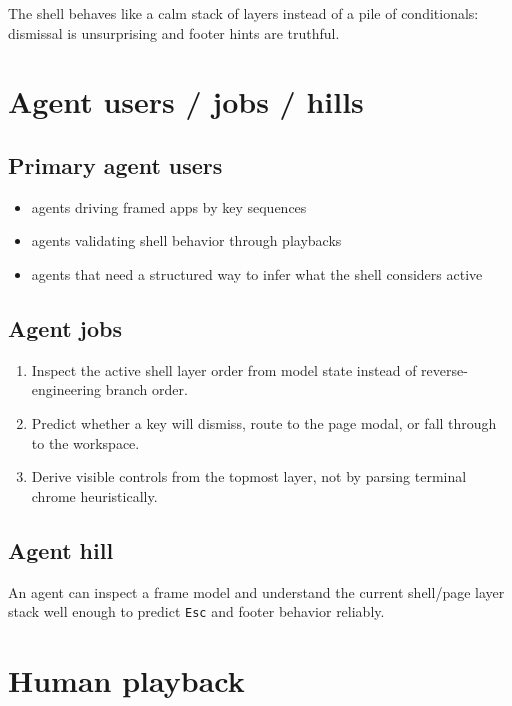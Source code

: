 The shell behaves like a calm stack of layers instead of a pile of conditionals: dismissal is unsurprising and footer hints are truthful.

\section{Agent users / jobs / hills}\label{record-255-agent-users-jobs-hills}

\subsection{Primary agent users}\label{record-255-primary-agent-users}

\begin{itemize}
\tightlist
\item
  agents driving framed apps by key sequences
\item
  agents validating shell behavior through playbacks
\item
  agents that need a structured way to infer what the shell considers active
\end{itemize}

\subsection{Agent jobs}\label{record-255-agent-jobs}

\begin{enumerate}
\def\labelenumi{\arabic{enumi}.}
\tightlist
\item
  Inspect the active shell layer order from model state instead of reverse-engineering branch order.
\item
  Predict whether a key will dismiss, route to the page modal, or fall through to the workspace.
\item
  Derive visible controls from the topmost layer, not by parsing terminal chrome heuristically.
\end{enumerate}

\subsection{Agent hill}\label{record-255-agent-hill}

An agent can inspect a frame model and understand the current shell/page layer stack well enough to predict \texttt{E\allowbreak{}s\allowbreak{}c} and footer behavior reliably.

\section{Human playback}\label{record-255-human-playback}

